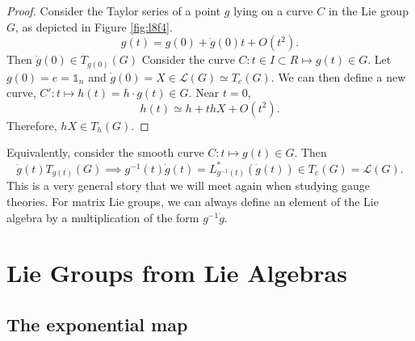\begin{proof}
  Consider the Taylor series of a point $g$ lying on a curve $C$ in the Lie group $G$, as depicted in Figure \ref{fig:l8f4}.
  \begin{equation}
    g(t) = g(0) + \dot g(0) t + O(t^2).
  \end{equation}
  Then $\dot g(0) \in T_{g(0)}(G)$
  Consider the curve $C\colon t \in I \subset R \mapsto g(t) \in G$. Let $g(0) = e = \mathbb{1}_n$ and $\dot g(0) = X \in \mathscr{L}(G) \simeq T_e(G)$.
  We can then define a new curve, $C' \colon t \mapsto h(t) = h \cdot g(t) \in G$. Near $t=0$,
  \begin{equation}
    h(t) \simeq h + t hX + O(t^2).
  \end{equation}
  Therefore, $hX \in T_h(G)$.
\end{proof}

Equivalently, consider the smooth curve $C \colon t \mapsto g(t) \in G$. Then
\begin{equation}
  \dot g(t) T_{g(t)}(G) \implies g^{-1}(t) \dot g(t) = L^*_{g^{-1}(t)} (\dot g(t)) \in T_e(G) = \mathscr{L}(G).
\end{equation}
This is a very general story that we will meet again when studying gauge theories.
For matrix Lie groups, we can always define an element of the Lie algebra by a multiplication of the form $g^{-1} \dot g$.

\chapter{Lie Groups from Lie Algebras}%
\label{cha:lie_groups_from_lie_algebras}

\section{The exponential map}%
\label{sec:the_exponential_map}

